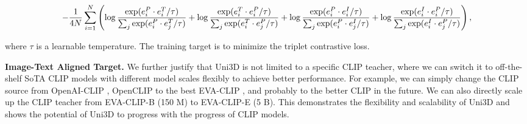 \documentclass{article} \usepackage{iclr2024_conference,times}
\def\Ours{Uni3D\xspace}
\begin{document}
\begin{equation}
\scriptsize
-\frac{1}{4N} \sum_{i=1}^N\left(\log\frac{\exp(e_i^P\cdot e_i^T/\tau)}{\sum_{j} \exp(e_i^P\cdot e_j^T/\tau)} +
\log\frac{\exp(e_i^T\cdot e_i^P/\tau)}{\sum_{j} \exp(e_i^T\cdot e_j^P/\tau)} + 
\log\frac{\exp(e_i^P\cdot e_i^I/\tau)}{\sum_{j} \exp(e_i^P\cdot e_j^I/\tau)} +
\log\frac{\exp(e_i^I\cdot e_i^P/\tau)}{\sum_{j} \exp(e_i^I\cdot e_j^P/\tau)}\right),
\end{equation}

where $\tau$ is a learnable temperature. The training target is to minimize the triplet contrastive loss.

\textbf{Image-Text Aligned Target.} We further justify that \Ours is not limited to a specific CLIP teacher, where we can switch it to off-the-shelf SoTA CLIP models with different model scales flexibly to achieve better performance. For example, we can simply change the CLIP source from OpenAI-CLIP \citep{radford2021learning}, OpenCLIP \citep{cherti2023reproducible} to the best EVA-CLIP \citep{sun2023eva}, and probably to the better CLIP in the future. We can also directly scale up the CLIP teacher from EVA-CLIP-B (150 M) to EVA-CLIP-E (5 B). This demonstrates the flexibility and scalability of \Ours and shows the potential of \Ours to progress with the progress of CLIP models.
\end{document}

